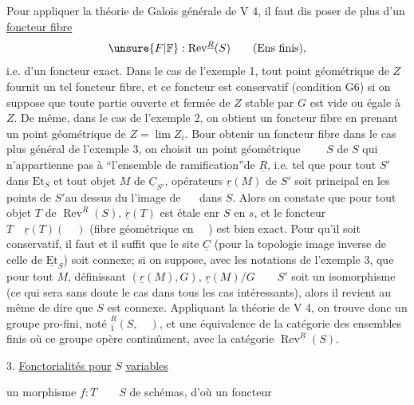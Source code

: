 Pour appliquer la théorie de Galois générale de V 4, il faut dis%
%
poser de plus d'un \uline{foncteur fibre}
\[
\unsure{F|\mathbb{F}}:\operatorname{Rev}^{\underline{R}}(S)\qquad(\mathrm{Ens\ finis}),
\]
i.e. d'un foncteur exact. Dans le cas de l'exemple 1, tout point géométrique de $Z$ fournit un tel foncteur fibre, et ce foncteur est conservatif (condition G6) si on suppose que toute partie ouverte et fermée de $Z$ stable par $G$ est vide ou égale à $Z$. De même, dans le cas de l'exemple 2, on obtient un  foncteur fibre en prenant un point géométrique de $Z=\lim Z_i$. Bour obtenir un foncteur fibre dans le cas plus général de l'exemple 3, on choisit un point géométrique $\qquad S$ de $S$  qui n'appartienne pas à ``l'ensemble de ramification''de $\underline{R}$, i.e. tel que pour tout $S'$ dans $\mathrm{Et}_S$ et tout objet $M$ de $\underline{C}_{S'}$,     opérateurs $\underline{r}(M)$  de $S'$ soit principal en les points de $S'$au dessus du l'image  de $\quad$ dans $S$. Alors   on constate que pour tout objet $T$ de $\operatorname{Rev}^{\underline{R}}(S)$, $\underline{r}(T)$ est étale enr $S$ en $s$, et le foncteur $T\quad\underline{r}(T)(\quad)$ (fibre géométrique en $\quad$) est bien exact. Pour qu'il soit conservatif, il faut et il suffit que le site $\underline{C}$ (pour la topologie image inverse de celle de $\underline{\mathrm{Et}}_S$) soit connexe;  si on suppose, avec les notations de l'exemple 3, que pour tout $M$, définissant $(\underline{r}(M),G)$, $\underline{r}(M)/G\qquad S'$ soit un isomorphisme (ce qui sera sans doute le cas dans tous les cas intéressants), alors il revient au même de dire que $S$ est connexe. Appliquant la théorie de V 4, on trouve donc un groupe pro-fini, noté ${}^{\underline{R}}_1(S,\quad)$,  et une équivalence de la catégorie des ensembles finis où ce groupe opère continûment, avec la catégorie $\operatorname{Rev}^{\underline{R}}(S)$.

3. \uline{Fonctorialités pour} $S$  \uline{variables}

 un morphisme $f:T\qquad S$ de schémas, d'où un foncteur
